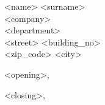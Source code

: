 
\begin{letter}{
    <name> <surname>\\
    <company>\\
    <department>\\
    <street> <building\_no>\\
    <zip\_code> <city>
}

\opening{<opening>,}

\lipsum[4]
\lipsum[1]

\closing{<closing>,}

\end{letter}
